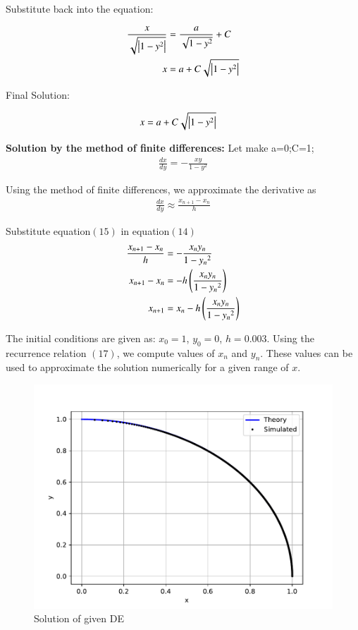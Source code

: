 \documentclass[journal,12pt,onecolumn]{IEEEtran}
\theoremstyle{remark}
\begin{document}
Substitute back into the equation:

\begin{align}
	\frac{x}{\sqrt{\left\vert1-y^2\right\vert}}&=\frac{a}{\sqrt{1-y^2}}+C\\
	x&=a+C\sqrt{\left\vert1-y^2\right\vert}
\end{align}

Final Solution:

\begin{align}
	x&=a+C\sqrt{\left\vert1-y^2\right\vert}
\end{align}

\textbf{Solution by the method of finite differences:}
Let make a=0;C=1;
\begin{align}
	\frac{dx}{dy} = -\frac{xy}{1-y^2}
\end{align}

Using the method of finite differences, we approximate the derivative as
\begin{align}
    \frac{dx}{dy} \approx \frac{x_{n+1} - x_n}{h}
\end{align}
 
Substitute equation$(15)$ in equation$(14)$
\begin{align}
	\frac{x_{n+1} - x_n}{h} &= -\frac{x_ny_n}{1-{y_n}^2} \\
	x_{n+1}-x_n &= -h\left(\frac{x_ny_n}{1-{y_n}^2}\right)\\
	x_{n+1} &= x_n-h\left(\frac{x_ny_n}{1-{y_n}^2}\right)
\end{align}

The initial conditions are given as:  $x_0 = 1$, $y_0 = 0$, $h=0.003$. Using the recurrence relation $(17)$, we compute values of $x_n$ and $y_n$. These values can be used to approximate the solution numerically for a given range of $x$.

\begin{figure}[h]
	\centering
	\includegraphics[width=\columnwidth]{figs/fig.pdf}
	\caption{Solution of given DE}
	\label{fig}
\end{figure}
\end{document}
